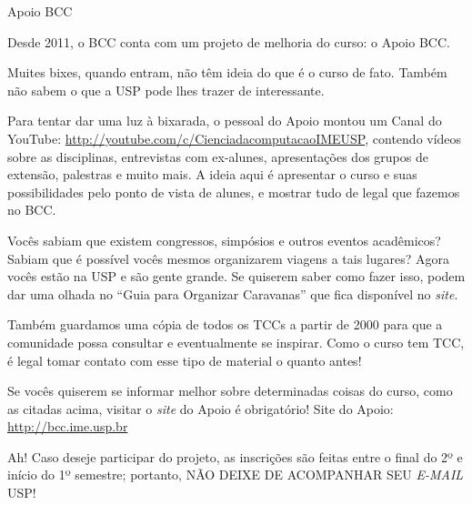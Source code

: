 \begin{subsubsecao}{Apoio BCC}

Desde 2011, o BCC conta com um projeto de melhoria do curso: o Apoio BCC.

Muites bixes, quando entram, não têm ideia do que é o curso de fato. Também não
sabem o que a USP pode lhes trazer de interessante.

Para tentar dar uma luz à bixarada, o pessoal do Apoio montou um Canal do YouTube:
\url{http://youtube.com/c/CienciadacomputacaoIMEUSP}, contendo vídeos sobre as disciplinas,
entrevistas com ex-alunes, apresentações dos grupos de extensão, palestras e muito
mais. A ideia aqui é apresentar o curso e suas possibilidades pelo ponto de vista
de alunes, e mostrar tudo de legal que fazemos no BCC.

Vocês sabiam que existem congressos, simpósios e outros eventos acadêmicos?
Sabiam que é possível vocês mesmos organizarem viagens a tais lugares? Agora
vocês estão na USP e são gente grande. Se quiserem saber como fazer isso, podem 
dar uma olhada no ``Guia para Organizar Caravanas'' que fica disponível 
no \textit{site}.

Também guardamos uma cópia de todos os TCCs a partir de 2000 para que a 
comunidade possa consultar e eventualmente se inspirar. Como o curso tem TCC, é 
legal tomar contato com esse tipo de material o quanto antes!

Se vocês quiserem se informar melhor sobre determinadas coisas do curso, como as
citadas acima, visitar o \textit{site} do Apoio é obrigatório! Site do Apoio: \url{http://bcc.ime.usp.br}

Ah! Caso deseje participar do projeto, as inscrições são feitas entre
o final do 2º e início do 1º semestre;
portanto, NÃO DEIXE DE ACOMPANHAR SEU
\textit{E-MAIL} USP!

\end{subsubsecao}
